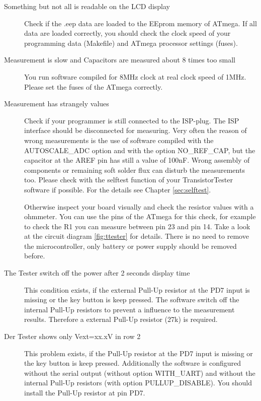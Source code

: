 \begin{description}
\item[Something but not all is readable on the LCD display]
Check if the .eep data are loaded to the EEprom memory of ATmega.
If all data are loaded correctly, you should check the clock speed of your
programming data (Makefile) and ATmega processor settings (fuses).

\item[Measurement is slow and Capacitors are measured about 8 times too small]
You run software compiled for 8MHz clock at real clock speed of 1MHz.
Please set the fuses of the ATmega correctly.

\item[Measurement has strangely values]
Check if your programmer is still connected to the ISP-plug.
The ISP interface should be disconnected for measuring.
Very often the reason of wrong measurements is the use of software compiled with
the AUTOSCALE\_ADC option and with the option NO\_REF\_CAP, but the capacitor
at the AREF pin has still a value of 100nF.
Wrong assembly of components or remaining soft solder flux can disturb the 
measurements too. Please check with the selftest function of your TransistorTester software
if possible. For the details see Chapter \ref{sec:selftest}.

Otherwise inspect your board visually and check the resistor values
with a ohmmeter. You can use the pins of the ATmega for this check, for example
to check the R1 you can measure between pin 23 and pin 14. Take a look at the
circuit diagram \ref{fig:ttester} for details. There is no need to
remove the microcontroller, only battery or power supply should be removed before.

\item[The Tester switch off the power after 2 seconds display time] 
This condition exists, if the external Pull-Up resistor at the PD7 input
is missing or the key button is keep pressed.
The software switch off the internal Pull-Up resistors to prevent a influence
to the measurement results. Therefore a external Pull-Up resistor (27k) is required.

\item[Der Tester shows only Vext=xx.xV in row 2]
This problem exists, if the Pull-Up resistor at the PD7 input
is missing or the key button is keep pressed.
Additionally the software is configured without the serial output (without option WITH\_UART) and
without the internal Pull-Up resistors (with option PULLUP\_DISABLE).
You should install the Pull-Up resistor at pin PD7.


\end{description}
